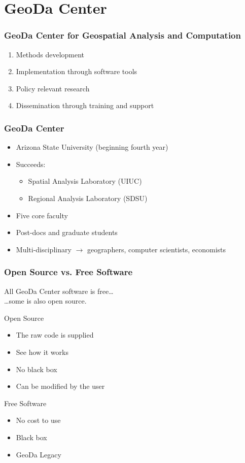 \section{GeoDa Center} 

\begin{frame}
	\frametitle{GeoDa Center for Geospatial Analysis and Computation}
  \begin{enumerate}
  \item Methods development
  \item Implementation through software tools
  \item Policy relevant research
  \item Dissemination through training and support
  \end{enumerate}
 \end{frame} 

\begin{frame}
	\frametitle{GeoDa Center}
 \begin{itemize}
 \item Arizona State University (beginning fourth year)
 \item Succeeds:
 \begin{itemize}
 \item Spatial Analysis Laboratory (UIUC)
 \item Regional Analysis Laboratory (SDSU)
 \end{itemize}
 \item Five core faculty
 \item Post-docs and graduate students
 \item Multi-disciplinary $\rightarrow$ geographers, computer scientists, economists
 \end{itemize}
 \end{frame} 

\begin{frame}
	\frametitle{Open Source vs. Free Software}
  All GeoDa Center software is free\dots \\ \qquad\qquad\qquad\qquad\qquad\dots some is also open source.
 
\begin{block}{Open Source}
 \begin{itemize}
 \item The raw code is supplied
 \item See how it works
 \item No black box
 \item Can be modified by the user
 \end{itemize}
 \end{block} 
\begin{block}{Free Software}
 \begin{itemize}
 \item No cost to use
 \item Black box
 \item GeoDa Legacy
 \end{itemize}
 \end{block} \end{frame} 

